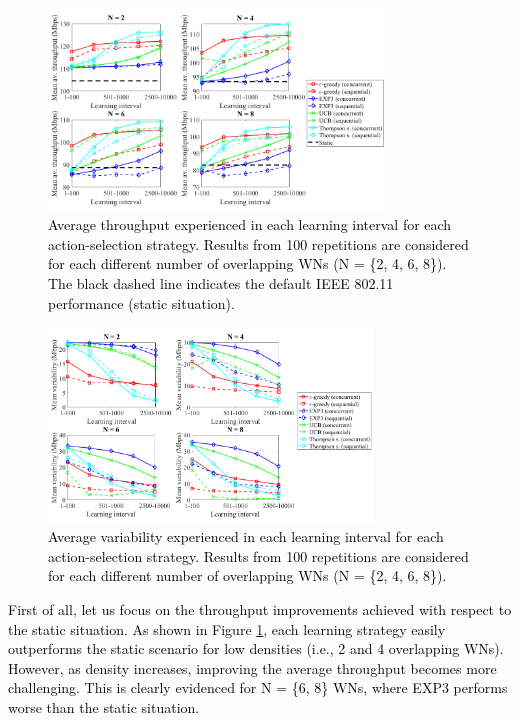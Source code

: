 \documentclass{article}
\begin{document}
	\begin{figure}[h!]
		\centering
		\includegraphics[width=0.8\textwidth]{images/random_scenarios_results}
		\caption{\textcolor{black}{Average throughput experienced in each learning interval for each action-selection strategy. Results from 100 repetitions are considered for each different number of overlapping WNs (N = \{2, 4, 6, 8\}). The black dashed line indicates the default IEEE 802.11 performance (static situation).}}
		\label{fig:random_scenarios_results}
	\end{figure}
	
	\begin{figure}[h!]
		\centering
		\includegraphics[width=0.77\textwidth]{images/random_scenarios_results_variability}
		\caption{\textcolor{black}{Average variability experienced in each learning interval for each action-selection strategy. Results from 100 repetitions are considered for each different number of overlapping WNs (N = \{2, 4, 6, 8\}).}}
		\label{fig:random_scenarios_results_variability}
	\end{figure}
	
	\textcolor{black}{First of all, let us focus on the throughput improvements achieved with respect to the static situation. As shown in Figure \ref{fig:random_scenarios_results}, each learning strategy easily outperforms the static scenario for low densities (i.e., 2 and 4 overlapping WNs). However, as density increases, improving the average throughput becomes more challenging. This is clearly evidenced for N = \{6, 8\} WNs, where EXP3 performs worse than the static situation.}
	
\end{document}
